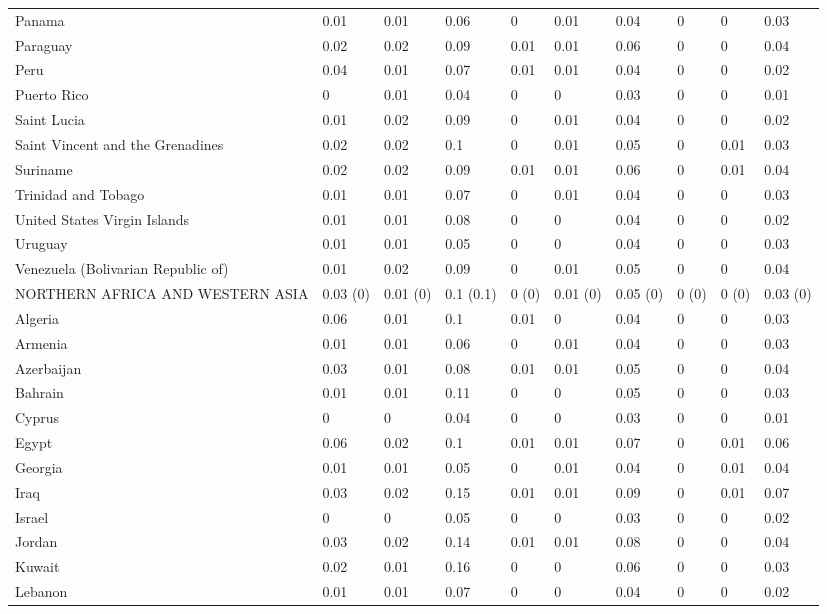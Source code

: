 \begin{longtable}[t]{llllllllll}
Panama & 0.01 & 0.01 & 0.06 & 0 & 0.01 & 0.04 & 0 & 0 & 0.03\\
Paraguay & 0.02 & 0.02 & 0.09 & 0.01 & 0.01 & 0.06 & 0 & 0 & 0.04\\
Peru & 0.04 & 0.01 & 0.07 & 0.01 & 0.01 & 0.04 & 0 & 0 & 0.02\\
Puerto Rico & 0 & 0.01 & 0.04 & 0 & 0 & 0.03 & 0 & 0 & 0.01\\
Saint Lucia & 0.01 & 0.02 & 0.09 & 0 & 0.01 & 0.04 & 0 & 0 & 0.02\\
Saint Vincent and the Grenadines & 0.02 & 0.02 & 0.1 & 0 & 0.01 & 0.05 & 0 & 0.01 & 0.03\\
Suriname & 0.02 & 0.02 & 0.09 & 0.01 & 0.01 & 0.06 & 0 & 0.01 & 0.04\\
Trinidad and Tobago & 0.01 & 0.01 & 0.07 & 0 & 0.01 & 0.04 & 0 & 0 & 0.03\\
United States Virgin Islands & 0.01 & 0.01 & 0.08 & 0 & 0 & 0.04 & 0 & 0 & 0.02\\
Uruguay & 0.01 & 0.01 & 0.05 & 0 & 0 & 0.04 & 0 & 0 & 0.03\\
Venezuela (Bolivarian Republic of) & 0.01 & 0.02 & 0.09 & 0 & 0.01 & 0.05 & 0 & 0 & 0.04\\
NORTHERN AFRICA AND WESTERN ASIA & 0.03 (0) & 0.01 (0) & 0.1 (0.1) & 0 (0) & 0.01 (0) & 0.05 (0) & 0 (0) & 0 (0) & 0.03 (0)\\
Algeria & 0.06 & 0.01 & 0.1 & 0.01 & 0 & 0.04 & 0 & 0 & 0.03\\
Armenia & 0.01 & 0.01 & 0.06 & 0 & 0.01 & 0.04 & 0 & 0 & 0.03\\
Azerbaijan & 0.03 & 0.01 & 0.08 & 0.01 & 0.01 & 0.05 & 0 & 0 & 0.04\\
Bahrain & 0.01 & 0.01 & 0.11 & 0 & 0 & 0.05 & 0 & 0 & 0.03\\
Cyprus & 0 & 0 & 0.04 & 0 & 0 & 0.03 & 0 & 0 & 0.01\\
Egypt & 0.06 & 0.02 & 0.1 & 0.01 & 0.01 & 0.07 & 0 & 0.01 & 0.06\\
Georgia & 0.01 & 0.01 & 0.05 & 0 & 0.01 & 0.04 & 0 & 0.01 & 0.04\\
Iraq & 0.03 & 0.02 & 0.15 & 0.01 & 0.01 & 0.09 & 0 & 0.01 & 0.07\\
Israel & 0 & 0 & 0.05 & 0 & 0 & 0.03 & 0 & 0 & 0.02\\
Jordan & 0.03 & 0.02 & 0.14 & 0.01 & 0.01 & 0.08 & 0 & 0 & 0.04\\
Kuwait & 0.02 & 0.01 & 0.16 & 0 & 0 & 0.06 & 0 & 0 & 0.03\\
Lebanon & 0.01 & 0.01 & 0.07 & 0 & 0 & 0.04 & 0 & 0 & 0.02\\

\end{longtable}
